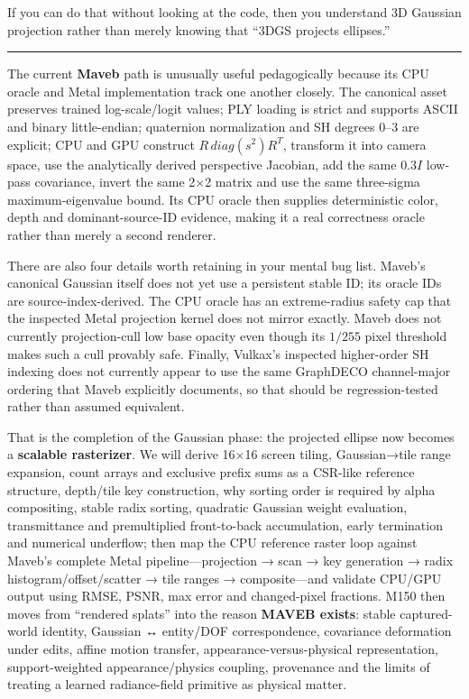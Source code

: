 If you can do that without looking at the code, then you understand 3D Gaussian projection rather than merely knowing that ``3DGS projects ellipses.''

\begin{center}\rule{0.5\linewidth}{0.5pt}\end{center}

The current \textbf{Maveb} path is unusually useful pedagogically because its CPU oracle and Metal implementation track one another closely. The canonical asset preserves trained log-scale/logit values; PLY loading is strict and supports ASCII and binary little-endian; quaternion normalization and SH degrees 0--3 are explicit; CPU and GPU construct \(R\,diag(s^2)R^T\), transform it into camera space, use the analytically derived perspective Jacobian, add the same \(0.3I\) low-pass covariance, invert the same 2×2 matrix and use the same three-sigma maximum-eigenvalue bound. Its CPU oracle then supplies deterministic color, depth and dominant-source-ID evidence, making it a real correctness oracle rather than merely a second renderer.

There are also four details worth retaining in your mental bug list. Maveb's canonical Gaussian itself does not yet use a persistent stable ID; its oracle IDs are source-index-derived. The CPU oracle has an extreme-radius safety cap that the inspected Metal projection kernel does not mirror exactly. Maveb does not currently projection-cull low base opacity even though its \(1/255\) pixel threshold makes such a cull provably safe. Finally, Vulkax's inspected higher-order SH indexing does not currently appear to use the same GraphDECO channel-major ordering that Maveb explicitly documents, so that should be regression-tested rather than assumed equivalent.

That is the completion of the Gaussian phase: the projected ellipse now becomes a \textbf{scalable rasterizer}. We will derive 16×16 screen tiling, Gaussian→tile range expansion, count arrays and exclusive prefix sums as a CSR-like reference structure, depth/tile key construction, why sorting order is required by alpha compositing, stable radix sorting, quadratic Gaussian weight evaluation, transmittance and premultiplied front-to-back accumulation, early termination and numerical underflow; then map the CPU reference raster loop against Maveb's complete Metal pipeline---projection → scan → key generation → radix histogram/offset/scatter → tile ranges → composite---and validate CPU/GPU output using RMSE, PSNR, max error and changed-pixel fractions. M150 then moves from ``rendered splats'' into the reason \textbf{MAVEB exists}: stable captured-world identity, Gaussian ↔ entity/DOF correspondence, covariance deformation under edits, affine motion transfer, appearance-versus-physical representation, support-weighted appearance/physics coupling, provenance and the limits of treating a learned radiance-field primitive as physical matter.


